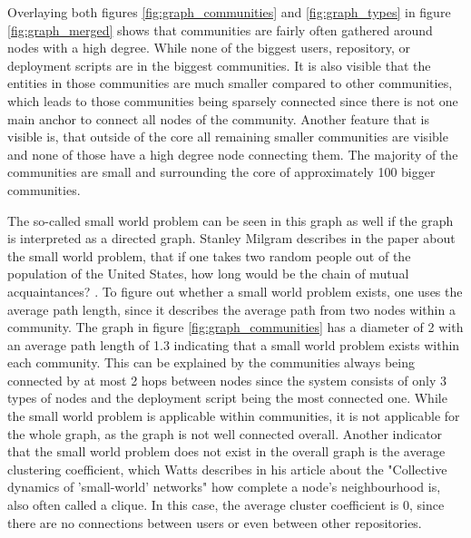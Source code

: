 Overlaying both figures \ref{fig:graph_communities} and \ref{fig:graph_types} in figure \ref{fig:graph_merged} shows that communities are fairly often gathered around nodes with a high degree. While none of the biggest users, repository, or deployment scripts are in the biggest communities. It is also visible that the entities in those communities are much smaller compared to other communities, which leads to those communities being sparsely connected since there is not one main anchor to connect all nodes of the community. Another feature that is visible is, that outside of the core all remaining smaller communities are visible and none of those have a high degree node connecting them. The majority of the communities are small and surrounding the core of approximately 100 bigger communities.

The so-called small world problem can be seen in this graph as well if the graph is interpreted as a directed graph. Stanley Milgram describes in the paper about the small world problem, that if one takes two random people out of the population of the United States, how long would be the chain of mutual acquaintances? \cite{SmallWorld}. To figure out whether a small world problem exists, one uses the average path length, since it describes the average path from two nodes within a community. The graph in figure \ref{fig:graph_communities} has a diameter of 2 with an average path length of 1.3 indicating that a small world problem exists within each community. This can be explained by the communities always being connected by at most 2 hops between nodes since the system consists of only 3 types of nodes and the deployment script being the most connected one. While the small world problem is applicable within communities, it is not applicable for the whole graph, as the graph is not well connected overall. Another indicator that the small world problem does not exist in the overall graph is the average clustering coefficient, which Watts describes in his article about the "Collective dynamics of 'small-world' networks" \cite{Watts1998Collective} how complete a node's neighbourhood is, also often called a clique. In this case, the average cluster coefficient is 0, since there are no connections between users or even between other repositories.

